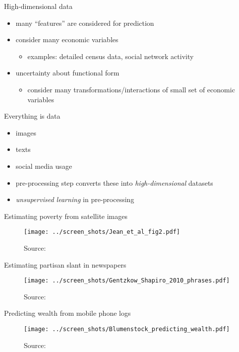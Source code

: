 \documentclass[xcolor=dvipsnames]{beamer}
\begin{document}
\begin{frame}{High-dimensional data}
\begin{itemize}
  \item many ``features'' are considered for prediction
  \pause\item consider many economic variables 
  \begin{itemize}
    \item examples: detailed census data, social network activity
  \end{itemize}
  \pause\item uncertainty about functional form 
  \begin{itemize}
    \item consider many transformations/interactions of small set of economic variables
  \end{itemize}
\end{itemize}
\end{frame}


\begin{frame}{Everything is data}
\begin{itemize}
  \item images 
  \item texts 
  \item social media usage 
  \pause
  \item pre-processing step converts these into \emph{high-dimensional} datasets
  \item \emph{unsupervised learning} in pre-processing  
\end{itemize}
\end{frame}

\begin{frame}{Estimating poverty from satellite images}
\begin{figure}
  \texttt{[image: ../screen\_shots/Jean\_et\_al\_fig2.pdf]}
   \caption{Source: \textcite{jean2016combining}}
\end{figure}
\end{frame}


\begin{frame}{Estimating partisan slant in newspapers}
\begin{figure}
  \texttt{[image: ../screen\_shots/Gentzkow\_Shapiro\_2010\_phrases.pdf]}
   \caption{Source: \textcite{gentzkow2010drives}}
\end{figure}
\end{frame}


\begin{frame}{Predicting wealth from mobile phone logs}
\begin{figure}
  \texttt{[image: ../screen\_shots/Blumenstock\_predicting\_wealth.pdf]}
   \caption{Source: \textcite{blumenstock2015predicting}}
\end{figure}
\end{frame}
\end{document}
